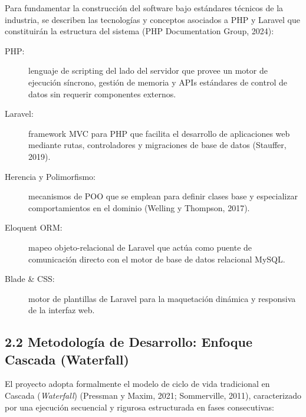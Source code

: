 \documentclass[12pt,a4paper]{article}
\begin{document}
Para fundamentar la construcci\'on del software bajo est\'andares t\'ecnicos de la
industria, se describen las tecnolog\'ias y conceptos asociados a PHP y Laravel
que constituir\'an la estructura del sistema (PHP Documentation Group, 2024):

\begin{description}
  \item[PHP:] lenguaje de scripting del lado del servidor que provee un motor
        de ejecuci\'on s\'incrono, gesti\'on de memoria y APIs est\'andares
        de control de datos sin requerir componentes externos.
  \item[Laravel:] framework MVC para PHP que facilita el desarrollo de
        aplicaciones web mediante rutas, controladores y migraciones de base de datos (Stauffer, 2019).
  \item[Herencia y Polimorfismo:] mecanismos de POO que se emplean para
        definir clases base y especializar comportamientos en el dominio (Welling y Thompson, 2017).
  \item[Eloquent ORM:] mapeo objeto-relacional de Laravel que act\'ua como
        puente de comunicaci\'on directo con el motor de base de datos relacional MySQL.
  \item[Blade \& CSS:] motor de plantillas de Laravel para la maquetaci\'on din\'amica y responsiva de la interfaz web.
\end{description}

\subsection{2.2 Metodolog\'ia de Desarrollo: Enfoque Cascada (Waterfall)}

El proyecto adopta formalmente el modelo de ciclo de vida tradicional en Cascada (\emph{Waterfall}) (Pressman y Maxim, 2021; Sommerville, 2011), caracterizado por una ejecuci\'on secuencial y rigurosa estructurada en fases consecutivas:
\end{document}
